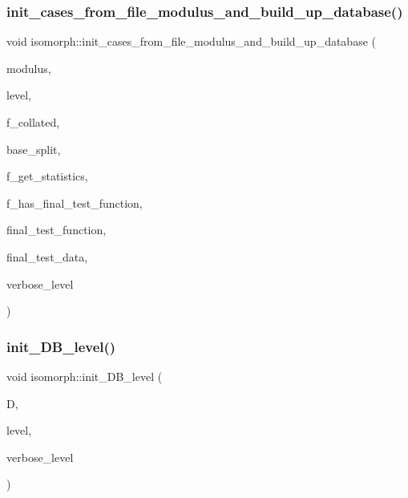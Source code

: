 \subsubsection{\texorpdfstring{init\+\_\+cases\+\_\+from\+\_\+file\+\_\+modulus\+\_\+and\+\_\+build\+\_\+up\+\_\+database()}{init\_cases\_from\_file\_modulus\_and\_build\_up\_database()}}
{\footnotesize\ttfamily void isomorph\+::init\+\_\+cases\+\_\+from\+\_\+file\+\_\+modulus\+\_\+and\+\_\+build\+\_\+up\+\_\+database (\begin{DoxyParamCaption}\item[{\mbox{\hyperlink{galois_8h_a09fddde158a3a20bd2dcadb609de11dc}{I\+NT}}}]{modulus,  }\item[{\mbox{\hyperlink{galois_8h_a09fddde158a3a20bd2dcadb609de11dc}{I\+NT}}}]{level,  }\item[{\mbox{\hyperlink{galois_8h_a09fddde158a3a20bd2dcadb609de11dc}{I\+NT}}}]{f\+\_\+collated,  }\item[{\mbox{\hyperlink{galois_8h_a09fddde158a3a20bd2dcadb609de11dc}{I\+NT}}}]{base\+\_\+split,  }\item[{\mbox{\hyperlink{galois_8h_a09fddde158a3a20bd2dcadb609de11dc}{I\+NT}}}]{f\+\_\+get\+\_\+statistics,  }\item[{\mbox{\hyperlink{galois_8h_a09fddde158a3a20bd2dcadb609de11dc}{I\+NT}}}]{f\+\_\+has\+\_\+final\+\_\+test\+\_\+function,  }\item[{\mbox{\hyperlink{galois_8h_a09fddde158a3a20bd2dcadb609de11dc}{I\+NT}}($\ast$)(\mbox{\hyperlink{galois_8h_a09fddde158a3a20bd2dcadb609de11dc}{I\+NT}} $\ast$data, \mbox{\hyperlink{galois_8h_a09fddde158a3a20bd2dcadb609de11dc}{I\+NT}} sz, void $\ast$final\+\_\+test\+\_\+data, \mbox{\hyperlink{galois_8h_a09fddde158a3a20bd2dcadb609de11dc}{I\+NT}} \mbox{\hyperlink{simeon_8_c_a818073fbcc2f439e7c56952f67386122}{verbose\+\_\+level}})}]{final\+\_\+test\+\_\+function,  }\item[{void $\ast$}]{final\+\_\+test\+\_\+data,  }\item[{\mbox{\hyperlink{galois_8h_a09fddde158a3a20bd2dcadb609de11dc}{I\+NT}}}]{verbose\+\_\+level }\end{DoxyParamCaption})}

\mbox{\label{classisomorph_a1a2df5281026bc94d57ebce33d67fe6c}} 
\subsubsection{\texorpdfstring{init\+\_\+\+D\+B\+\_\+level()}{init\_DB\_level()}}
{\footnotesize\ttfamily void isomorph\+::init\+\_\+\+D\+B\+\_\+level (\begin{DoxyParamCaption}\item[{\mbox{\hyperlink{classdatabase}{database}} \&}]{D,  }\item[{\mbox{\hyperlink{galois_8h_a09fddde158a3a20bd2dcadb609de11dc}{I\+NT}}}]{level,  }\item[{\mbox{\hyperlink{galois_8h_a09fddde158a3a20bd2dcadb609de11dc}{I\+NT}}}]{verbose\+\_\+level }\end{DoxyParamCaption})}

